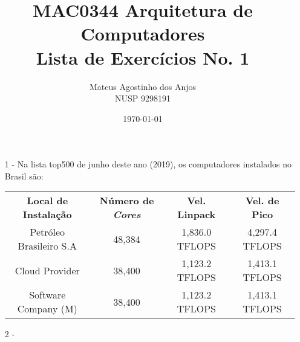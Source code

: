 \documentclass[12pt]{article}
\title{MAC0344 Arquitetura de Computadores\\
Lista de Exercícios No. 1
}
\author{Mateus Agostinho dos Anjos\\NUSP 9298191}
\date{\today}
\begin{document}
	\maketitle
	\begin{itemize}
		\item[1 -]
			Na lista top500 de junho deste ano (2019), os
			computadores instalados no Brasil são:\\
			\begin{table}[h!]
				\centering
				\begin{tabular}{c|c|c|c}
					\textbf{Local de Instalação} & \textbf{Número de \textit{Cores}} & \textbf{Vel. Linpack} & \textbf{Vel. de Pico}\\
					Petróleo Brasileiro S.A & 48,384 & 1,836.0 TFLOPS & 4,297.4 TFLOPS \\
					Cloud Provider & 38,400 & 1,123.2 TFLOPS & 1,413.1 TFLOPS \\
					Software Company (M) & 38,400 & 1,123.2 TFLOPS & 1,413.1 TFLOPS\\
				\end{tabular}
			\end{table}	
		\item[2 -]				
	\end{itemize}
		
\end{document}
